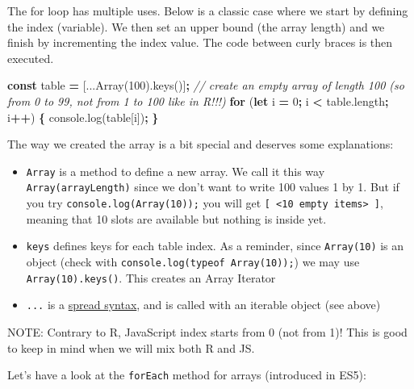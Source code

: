 \documentclass[
]{book}
\newenvironment{Shaded}{\begin{snugshade}}{\end{snugshade}}
\newcommand{\AttributeTok}[1]{\textcolor[rgb]{0.77,0.63,0.00}{#1}}
\newcommand{\CommentTok}[1]{\textcolor[rgb]{0.56,0.35,0.01}{\textit{#1}}}
\newcommand{\ControlFlowTok}[1]{\textcolor[rgb]{0.13,0.29,0.53}{\textbf{#1}}}
\newcommand{\DecValTok}[1]{\textcolor[rgb]{0.00,0.00,0.81}{#1}}
\newcommand{\KeywordTok}[1]{\textcolor[rgb]{0.13,0.29,0.53}{\textbf{#1}}}
\newcommand{\NormalTok}[1]{#1}
\newcommand{\OperatorTok}[1]{\textcolor[rgb]{0.81,0.36,0.00}{\textbf{#1}}}
\newcommand{\VariableTok}[1]{\textcolor[rgb]{0.00,0.00,0.00}{#1}}
\providecommand{\tightlist}{%
  \setlength{\itemsep}{0pt}\setlength{\parskip}{0pt}}
\begin{document}
The for loop has multiple uses. Below is a classic case where we start by defining the index (variable). We then set an upper bound (the array length) and we finish by incrementing the index value. The code between curly braces is then executed.

\begin{Shaded}
\begin{Highlighting}[]
\KeywordTok{const}\NormalTok{ table }\OperatorTok{=}\NormalTok{ [...}\AttributeTok{Array}\NormalTok{(}\DecValTok{100}\NormalTok{).}\AttributeTok{keys}\NormalTok{()]}\OperatorTok{;} \CommentTok{// create an empty array of length 100 (so from 0 to 99, not from 1 to 100 like in R!!!)}
\ControlFlowTok{for}\NormalTok{ (}\KeywordTok{let}\NormalTok{ i }\OperatorTok{=} \DecValTok{0}\OperatorTok{;}\NormalTok{ i }\OperatorTok{<} \VariableTok{table}\NormalTok{.}\AttributeTok{length}\OperatorTok{;}\NormalTok{ i}\OperatorTok{++}\NormalTok{) }\OperatorTok{\{}
    \VariableTok{console}\NormalTok{.}\AttributeTok{log}\NormalTok{(table[i])}\OperatorTok{;} 
\OperatorTok{\}}
\end{Highlighting}
\end{Shaded}

The way we created the array is a bit special and deserves some explanations:

\begin{itemize}
\tightlist
\item
  \texttt{Array} is a method to define a new array. We call it this way \texttt{Array(arrayLength)} since we don't want to write 100 values 1 by 1. But if you try \texttt{console.log(Array(10));} you will get \texttt{{[}\ \textless{}10\ empty\ items\textgreater{}\ {]}}, meaning that 10 slots are available but nothing is inside yet.
\item
  \texttt{keys} defines keys for each table index. As a reminder, since \texttt{Array(10)} is an object (check with \texttt{console.log(typeof\ Array(10));}) we may use \texttt{Array(10).keys()}. This creates an Array Iterator
\item
  \texttt{...} is a \href{https://developer.mozilla.org/en-US/docs/Web/JavaScript/Reference/Operators/Spread_syntax}{spread syntax}, and is called with an iterable object (see above)
\end{itemize}

NOTE: Contrary to R, JavaScript index starts from 0 (not from 1)! This is good to keep in mind when we will mix both R and JS.

Let's have a look at the \texttt{forEach} method for arrays (introduced in ES5):
\end{document}
